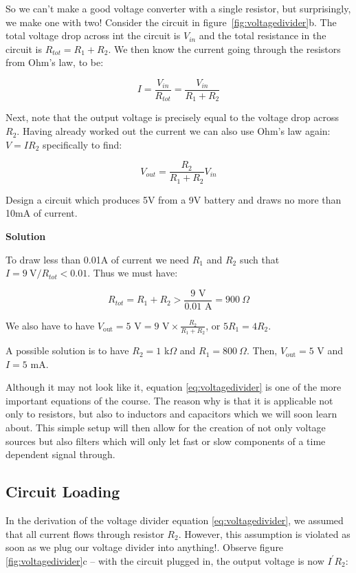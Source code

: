 \documentclass{tufte-book}
\newcommand\Solution{\par\textbf{\textsf{Solution}}\par\medskip}
\begin{document}
So we can't make a good voltage converter with a single resistor, but surprisingly, we make one with two! Consider the circuit in figure~\ref{fig:voltagedivider}b. The total voltage drop across int the circuit is $V_{in}$ and the total resistance in the circuit is $R_{tot} = R_1 + R_2$. We then know the current going through the resistors from Ohm's law, to be: 

\begin{equation}\label{eq:vd_deriv1}
I = \frac{V_{in}}{R_{tot}} = \frac{V_{in}}{R_1 + R_2}
\end{equation}

Next, note that the output voltage is precisely equal to the voltage drop across $R_2$. Having already worked out the current we can also use Ohm's law again: $V = IR_2$ specifically to find:

\begin{equation}\label{eq:voltagedivider}
\boxed{V_{out} = \frac{R_2}{R_1+R_2}V_{in}}
\end{equation}

\begin{myexample}[label = ex:voltage_divider]{Design a circuit which produces 5V from a 9V battery and draws no more than 10mA of current.}
\Solution
To draw less than 0.01A of current we need $R_1$ and $R_2$ such that $I = 9~\text{V}/R_{tot} < 0.01$. Thus we must have:

\begin{equation}
R_{tot} = R_1 + R_2 > \frac{9\text{ V}}{0.01\text{ A}} = 900~\Omega
\end{equation}


\noindent We also have to have $V_\text{out} = 5\text{ V} = 9\text{ V} \times \frac{R_2}{R_1+R_2}$, or $5R_1 = 4R_2$.

\noindent A possible solution is to have $R_2 = 1$ k$\Omega$ and $R_1 = 800~\Omega$. Then, $V_\text{out} = 5\text{ V}$ and $I = 5$ mA.

\end{myexample}


Although it may not look like it, equation \ref{eq:voltagedivider} is one of the more important equations of the course. The reason why is that it is applicable not only to resistors, but also to inductors and capacitors which we will soon learn about. This simple setup will then allow for the creation of not only voltage sources but also filters which will only let fast or slow components of a time dependent signal through.


\subsection{Circuit Loading} In the derivation of the voltage divider equation \ref{eq:voltagedivider}, we assumed that all current flows through resistor $R_2$. However, this assumption is violated as soon as we plug our voltage divider into anything!. Observe figure \ref{fig:voltagedivider}c -- with the circuit plugged in, the output voltage is now $I^\prime R_2$:
\end{document}
